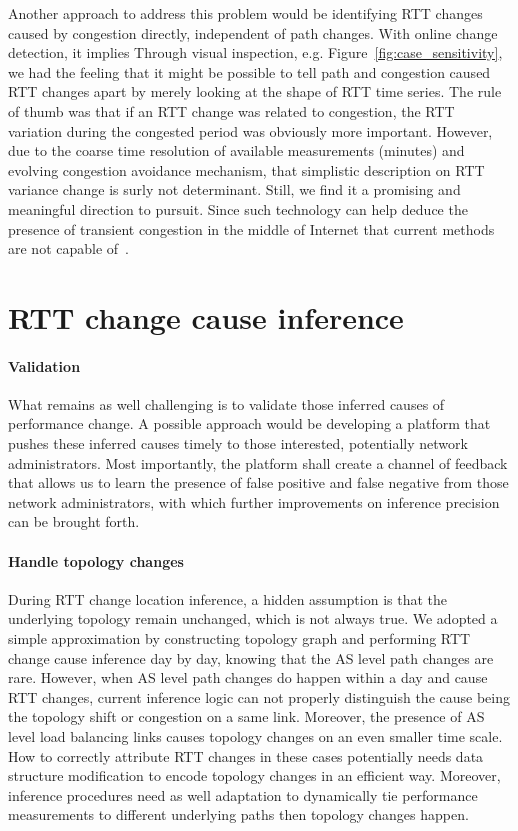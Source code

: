 Another approach to address this problem would be identifying RTT changes caused by congestion directly, independent of path changes. 
With online change detection, it implies 
Through visual inspection, e.g. Figure~\ref{fig:case_sensitivity}, we had the feeling that it might be possible to tell path and congestion caused RTT changes apart by merely looking at the shape of RTT time series. The rule of thumb was that if an RTT change was related to congestion, the RTT variation during the congested period was obviously more important. However, due to the coarse time resolution of available measurements (minutes) and evolving congestion avoidance mechanism, that simplistic description on RTT variance change is surly not determinant. Still, we find it a promising and meaningful direction to pursuit. Since such technology can help deduce the presence of transient congestion in the middle of Internet that current methods are not capable of~\cite{Luckie2014}.

\section{RTT change cause inference}
\paragraph*{Validation} What remains as well challenging is to validate those inferred causes of performance change. A possible approach would be developing a platform that pushes these inferred causes timely to those interested, potentially network administrators. Most importantly, the platform shall create a channel of feedback that allows us to learn the presence of false positive and false negative from those network administrators, with which further improvements on inference precision can be brought forth.

\paragraph*{Handle topology changes} During RTT change location inference, a hidden assumption is that the underlying topology remain unchanged, which is not always true. We adopted a simple approximation by constructing topology graph and performing RTT change cause inference day by day, knowing that the AS level path changes are rare. 
However, when AS level path changes do happen within a day and cause RTT changes, current inference logic can not properly distinguish the cause being the topology shift or congestion on a same link.
Moreover, the presence of AS level load balancing links causes topology changes on an even smaller time scale. 
How to correctly attribute RTT changes in these cases potentially needs data structure modification to encode topology changes in an efficient way.
Moreover, inference procedures need as well adaptation to dynamically tie performance measurements to different underlying paths then topology changes happen.

